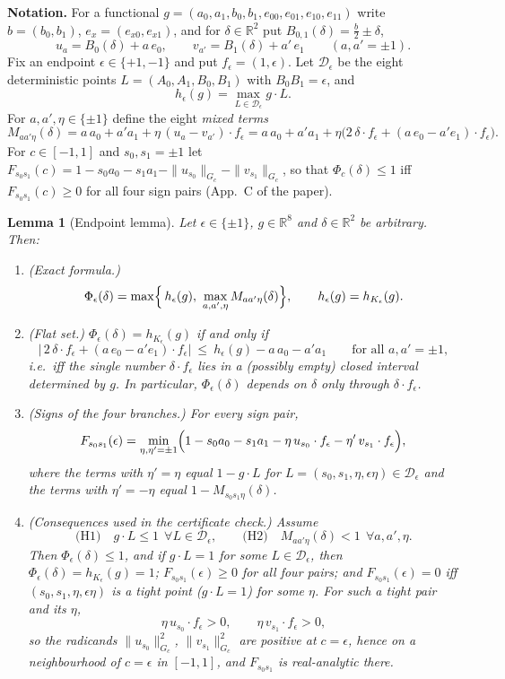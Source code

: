 \documentclass[11pt]{article}
\newtheorem{lemma}{Lemma}
\begin{document}
\noindent\textbf{Notation.} For a functional $g=(a_0,a_1,b_0,b_1,e_{00},e_{01},e_{10},e_{11})$ write
$b=(b_0,b_1)$, $e_x=(e_{x0},e_{x1})$, and for $\delta\in\mathbb R^2$ put $B_{0,1}(\delta)=\frac b2\pm\delta$,
\[
u_a=B_0(\delta)+a\,e_0,\qquad v_{a'}=B_1(\delta)+a'\,e_1\qquad(a,a'=\pm1).
\]
Fix an endpoint $\epsilon\in\{+1,-1\}$ and put $f_\epsilon=(1,\epsilon)$. Let $\mathcal D_\epsilon$ be the
eight deterministic points $L=(A_0,A_1,B_0,B_1)$ with $B_0B_1=\epsilon$, and
\[
h_\epsilon(g)=\max_{L\in\mathcal D_\epsilon} g\cdot L .
\]
For $a,a',\eta\in\{\pm1\}$ define the eight \emph{mixed terms}
\[
M_{a a'\eta}(\delta)=a\,a_0+a'a_1+\eta\,(u_a-v_{a'})\cdot f_\epsilon
 = a\,a_0+a'a_1+\eta\bigl(2\,\delta\cdot f_\epsilon+(a\,e_0-a'e_1)\cdot f_\epsilon\bigr).
\]
For $c\in[-1,1]$ and $s_0,s_1=\pm1$ let
$F_{s_0s_1}(c)=1-s_0a_0-s_1a_1-\|u_{s_0}\|_{G_c}-\|v_{s_1}\|_{G_c}$, so that $\Phi_c(\delta)\le1$ iff
$F_{s_0s_1}(c)\ge0$ for all four sign pairs (App.~C of the paper).

\begin{lemma}[Endpoint lemma]\label{lem:endpoint}
Let $\epsilon\in\{\pm1\}$, $g\in\mathbb R^8$ and $\delta\in\mathbb R^2$ be arbitrary. Then:
\begin{enumerate}
\item[(i)] \emph{(Exact formula.)}
\[
\Phi_\epsilon(\delta)=\max\Bigl\{\,h_\epsilon(g),\ \max_{a,a',\eta}M_{aa'\eta}(\delta)\Bigr\},
\qquad h_\epsilon(g)=h_{K_\epsilon}(g).
\]
\item[(ii)] \emph{(Flat set.)} $\Phi_\epsilon(\delta)=h_{K_\epsilon}(g)$ if and only if
\[
\bigl|\,2\,\delta\cdot f_\epsilon+(a\,e_0-a'e_1)\cdot f_\epsilon\bigr|\ \le\ h_\epsilon(g)-a\,a_0-a'a_1\qquad\text{for all }a,a'=\pm1,
\]
i.e.\ iff the single number $\delta\cdot f_\epsilon$ lies in a (possibly empty) closed interval determined by $g$.
In particular, $\Phi_\epsilon(\delta)$ depends on $\delta$ only through $\delta\cdot f_\epsilon$.
\item[(iii)] \emph{(Signs of the four branches.)} For every sign pair,
\[
F_{s_0s_1}(\epsilon)=\min_{\eta,\eta'=\pm1}\Bigl(1-s_0a_0-s_1a_1-\eta\,u_{s_0}\cdot f_\epsilon-\eta'\,v_{s_1}\cdot f_\epsilon\Bigr),
\]
where the terms with $\eta'=\eta$ equal $1-g\cdot L$ for $L=(s_0,s_1,\eta,\epsilon\eta)\in\mathcal D_\epsilon$ and
the terms with $\eta'=-\eta$ equal $1-M_{s_0s_1\eta}(\delta)$.
\item[(iv)] \emph{(Consequences used in the certificate check.)} Assume
\[
\text{(H1)}\quad g\cdot L\le1\ \ \forall L\in\mathcal D_\epsilon,\qquad
\text{(H2)}\quad M_{aa'\eta}(\delta)<1\ \ \forall a,a',\eta .
\]
Then $\Phi_\epsilon(\delta)\le1$, and if $g\cdot L=1$ for some $L\in\mathcal D_\epsilon$, then
$\Phi_\epsilon(\delta)=h_{K_\epsilon}(g)=1$; $F_{s_0s_1}(\epsilon)\ge0$ for all four pairs; and
$F_{s_0s_1}(\epsilon)=0$ iff $(s_0,s_1,\eta,\epsilon\eta)$ is a tight point ($g\cdot L=1$) for some $\eta$.
For such a tight pair and its $\eta$,
\[
\eta\,u_{s_0}\cdot f_\epsilon>0,\qquad \eta\,v_{s_1}\cdot f_\epsilon>0,
\]
so the radicands $\|u_{s_0}\|^2_{G_c}$, $\|v_{s_1}\|^2_{G_c}$ are positive at $c=\epsilon$, hence on a
neighbourhood of $c=\epsilon$ in $[-1,1]$, and $F_{s_0s_1}$ is real-analytic there.
\end{enumerate}
\end{lemma}
\end{document}
